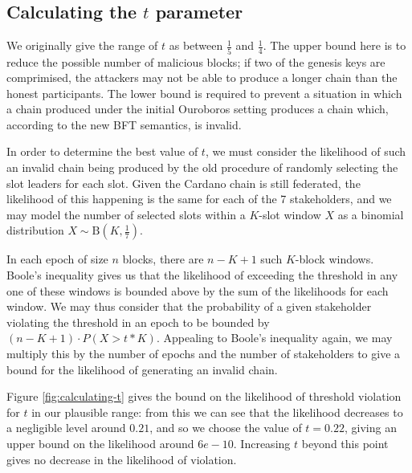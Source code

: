 \documentclass[11pt,a4paper]{article}
\begin{document}
\clearpage


\begin{appendices}
  \section{Calculating the $t$ parameter}
  \label{apdx:calculating-t}

  We originally give the range of $t$ as between $\frac{1}{5}$ and $\frac{1}{4}$.
  The upper bound here is to reduce the possible number of malicious blocks; if
  two of the genesis keys are comprimised, the attackers may not be able to
  produce a longer chain than the honest participants. The lower bound is required
  to prevent a situation in which a chain produced under the initial Ouroboros
  setting produces a chain which, according to the new BFT semantics, is invalid.

  In order to determine the best value of $t$, we must consider the likelihood of
  such an invalid chain being produced by the old procedure of randomly selecting
  the slot leaders for each slot. Given the Cardano chain is still federated, the
  likelihood of this happening is the same for each of the 7 stakeholders, and we
  may model the number of selected slots within a $K$-slot window $X$ as a binomial
  distribution $X \sim \mathrm{B}\left(K, \frac{1}{7}\right)$.

  In each epoch of size $n$ blocks, there are $n-K+1$ such $K$-block windows.
  Boole's inequality gives us that the likelihood of exceeding the threshold in
  any one of these windows is bounded above by the sum of the likelihoods for each
  window. We may thus consider that the probability of a given stakeholder
  violating the threshold in an epoch to be bounded by $(n-K+1)\cdot P(X > t*K)$.
  Appealing to Boole's inequality again, we may multiply this by the number of
  epochs and the number of stakeholders to give a bound for the likelihood of
  generating an invalid chain.

  Figure \ref{fig:calculating-t} gives the bound on the likelihood of threshold
  violation for $t$ in our plausible range: from this we can see that the
  likelihood decreases to a negligible level around $0.21$, and so we choose the
  value of $t=0.22$, giving an upper bound on the likelihood around $6e-10$.
  Increasing $t$ beyond this point gives no decrease in the likelihood of
  violation.


\end{appendices}
\end{document}
